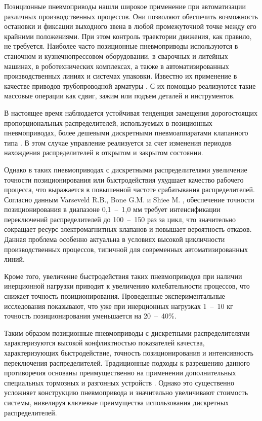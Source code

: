 
{\actuality}

Позиционные пневмоприводы нашли широкое применение при автоматизации различных производственных процессов.
Они позволяют обеспечить возможность остановки и фиксации выходного звена в любой промежуточной точке между
его крайними положениями. При этом контроль траектории движения, как правило, не требуется. Наиболее часто
позиционные пневмоприводы используются в станочном и кузнечнопрессовом оборудовании, в сварочных и
литейных машинах, в роботехнических комплексах, а также в автоматизированных производственных линиях
и системах упаковки. Известно их применение в качестве приводов трубопроводной арматуры \cite{Dolgov2017}. С их
помощью реализуются такие массовые операции как сдвиг, зажим или подъем деталей и инструментов.

В настоящее время наблюдается устойчивая тенденция замещения дорогостоящих пропорциональных распределителей,
используемых в позиционных пневмоприводах, более дешевыми дискретными пневмоаппаратами клапанного
типа \cite{Markov2007,Pilgunov2016, An2015}. В этом случае управление реализуется за счет изменения периодов нахождения
распределителей в открытом и закрытом состоянии.

Однако в таких пневмоприводах с дискретными распределителями увеличение точности
позиционирования или быстродействия ухудшает качество рабочего процесса, что выражается
в повышенной частоте срабатывания распределителей. Согласно данным Varseveld R.B., Bone G.M. и
Shiee M. \cite{pwm:Varseveld, Shiee}, обеспечение точности позиционирования в диапазоне 0,1~--~1,0 мм требует интенсификации
переключений распределителей до 100~--~150 раз за цикл, что значительно сокращает ресурс электромагнитных
клапанов и повышает вероятность отказов. Данная проблема особенно актуальна в условиях высокой цикличности
производственных процессов, типичной для современных автоматизированных линий.

Кроме того, увеличение быстродействия таких пневмоприводов при наличии инерционной нагрузки приводит к
увеличению колебательности процессов, что снижает точность позиционирования. Проведенные экспериментальные
исследования \cite{Greshnyakov2016,Hodgson:article1} показывают, что уже при
инерционных нагрузках 1~--~10 кг точность позиционирования уменьшается на 20~--~40\%.

Таким образом позиционные пневмоприводы с дискретными распределителями
характеризуются высокой конфликтностью показателей качества, характеризующих
быстродействие, точность позиционирования и интенсивность переключения распределителей.
Традиционные подходы к разрешению данного противоречия основаны преимущественно на применении
дополнительных специальных тормозных и разгонных устройств \cite{крутиков:способы_торможения_12,DaoTheAnh2016,Grishchenko2010}. Однако это существенно
усложняет конструкцию пневмопривода и значительно увеличивают стоимость системы, нивелируя ключевые
преимущества использования дискретных распределителей.

